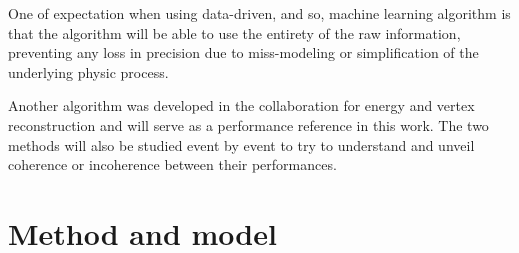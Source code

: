 One of expectation when using data-driven, and so, machine learning algorithm is that the algorithm will be able to use the entirety of the raw information, preventing any loss in precision due to miss-modeling or simplification of the underlying physic process.


Another algorithm was developed in the collaboration for energy and vertex reconstruction \cite{lebrin_towards_2022} and will serve as a performance reference in this work. The two methods will also be studied event by event to try to understand and unveil coherence or incoherence between their performances.


\section{Method and model}
